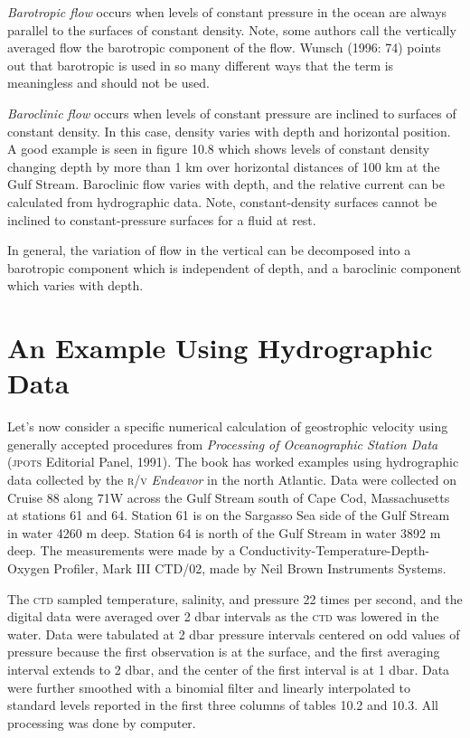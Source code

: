 \textit{Barotropic flow} occurs when levels of constant
pressure in the ocean are always parallel to the surfaces of constant density. Note,
some authors call the vertically averaged flow the barotropic component of the flow.
Wunsch (1996: 74) points out that barotropic is used in so many different ways
that the term is meaningless and should not be used.

\textit{Baroclinic flow} occurs when levels of constant
pressure are inclined to surfaces of constant density. In this case, density varies with
depth and horizontal position. A good example is seen in figure 10.8 which shows levels
of constant density changing depth by more than 1 km over horizontal distances of 100 km
at the Gulf Stream. Baroclinic flow varies with depth, and the
relative current can be calculated from hydrographic data. Note, constant-density surfaces cannot be inclined to constant-pressure
surfaces for a fluid at rest.

In general, the variation of flow in the vertical can be decomposed into a
barotropic component which is independent of depth, and a baroclinic component
which varies with depth.

\section{An Example Using Hydrographic Data} Let's now consider a specific
numerical calculation of
geostrophic velocity using generally accepted procedures from \textit{Processing of
Oceanographic Station Data} (\textsc{jpots} Editorial Panel, 1991). The book has worked
examples using hydrographic data collected
by the \textsc{r/v} \textit{Endeavor} in the north Atlantic. Data were collected on Cruise 88
along 71\degrees W across the Gulf Stream south of Cape
Cod, Massachusetts at stations 61 and 64. Station 61 is on the Sargasso Sea side of the Gulf
Stream in water 4260 m deep. Station 64 is north of the Gulf Stream in water 3892 m deep. The
measurements were made by a Conductivity-Temp\-erature-Depth-Oxygen Profiler, Mark III CTD/02, made by Neil Brown Ins\-truments Systems.

The \textsc{ctd} sampled temperature, salinity, and pressure 22 times per second,
and the digital data were averaged over 2 dbar intervals as the \textsc{ctd} was
lowered in the water. Data were tabulated at 2 dbar pressure intervals centered
on odd values of pressure because the first observation is at the surface, and
the first averaging interval extends to 2 dbar, and the center of the first
interval is at 1 dbar. Data were further smoothed with a binomial filter and
linearly interpolated to standard levels reported in the first three columns of
tables 10.2 and 10.3. All processing was done by computer.


